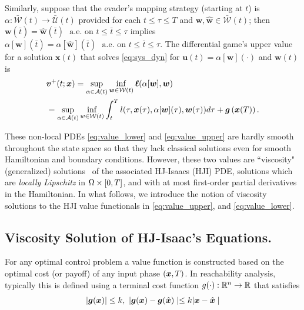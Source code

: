 Similarly, suppose that  the evader's mapping strategy (starting at $t$) is $\alpha: \mathcal{\bar{W}}({t}) \rightarrow \mathcal{\bar{U}}({t})$ provided for each $t \le \tau \le T$ and $\bm{w}, \hat{\bm{w}} \in \mathcal{\bar{W}}({t})$; then  $\bm{w}(\bar{t}) = \hat{\bm{w}}(\bar{t}) \,\, \text{ a.e. on } t \le \bar{t}  \le \tau$ implies $\alpha[\bm{w}](\bar{t}) = \alpha[\hat{\bm{w}}](\bar{t}) \,\, \text{ a.e. on } t \le \bar{t}  \le \tau$. The differential game's upper value for a solution $\bm{x}(t)$ that solves \eqref{eq:sys_dyn} for $\bm{u}(t) = \alpha[\bm{w}](\cdot)$ and $\bm{w}(t)$  is 
%
\begin{align}
	&\uppervalue(t; \state) = \sup_{\alpha \in \mathcal{A}(t)} \inf_{\bm{w} \in \mathcal{W}(t)}  \bm{\ell}(\alpha[\bm{w}], \bm{w}) \nonumber \\
	&=  \sup_{\alpha \in \mathcal{A}(t)} \inf_{w \in \mathcal{W}(t)} %
	\int_{t}^{T}l(\tau, \bm{x}(\tau), \alpha[\bm{w}](\tau), \bm{w}(\tau)) d\tau  + \bm{g}\left(\bm{x}(T)\right).
	\label{eq:value_upper}
\end{align}

These non-local PDEs \ie \eqref{eq:value_lower} and \eqref{eq:value_upper} are hardly smooth throughout the state space so that they  lack classical solutions even for smooth Hamiltonian and boundary conditions. However, these two values are ``viscosity" (generalized)  solutions~\citet{Lions1982, Crandall1983viscosity} of the associated HJ-Isaacs (HJI) PDE, \ie solutions which are \textit{locally Lipschitz} in $\Omega \times [0, T]$, and with at most first-order partial derivatives in the Hamiltonian. In what follows, we introduce the notion of viscosity solutions to the HJI value functionals in \eqref{eq:value_upper}, and \eqref{eq:value_lower}.


\subsection{Viscosity Solution of HJ-Isaac's Equations.}
\label{subsec:visc}

\noindent  
For any optimal control problem a value function is constructed based on the optimal cost (or payoff) of any input phase $(\bm{x}, T)$.  In reachability analysis, typically this is defined using a terminal cost function $g(\cdot): \mathbb{R}^n \rightarrow \mathbb{R}$ that satisfies 
\begin{subequations}
	\begin{align}
		| \bm{g}(\bm{x}) | \le k, \,\,
		| \bm{g}(\bm{x}) - \bm{g}(\hat{\bm{x}}) \mid \le k | \bm{x} - \hat{\bm{x}} \mid
	\end{align}
\end{subequations}

